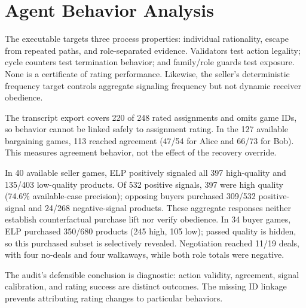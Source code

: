 \section{Agent Behavior Analysis}
\label{sec:behavior}

The executable targets three process properties: individual rationality,
escape from repeated paths, and role-separated evidence. Validators test action
legality; cycle counters test termination behavior; and family/role guards test
exposure. None is a certificate of rating performance. Likewise, the seller's
deterministic frequency target controls aggregate signaling frequency but not
dynamic receiver obedience.

The transcript export covers 220 of 248 rated assignments and omits game IDs,
so behavior cannot be linked safely to assignment rating. In the 127 available
bargaining games, 113 reached agreement (47/54 for Alice and 66/73 for Bob).
This measures agreement behavior, not the effect of the recovery override.

In 40 available seller games, ELP positively signaled all 397 high-quality and
135/403 low-quality products. Of 532 positive signals, 397 were high quality
(74.6\% available-case precision); opposing buyers purchased 309/532 positive-
signal and 24/268 negative-signal products. These aggregate responses neither
establish counterfactual purchase lift nor verify obedience. In 34 buyer games,
ELP purchased 350/680 products (245 high, 105 low); passed quality is hidden, so
this purchased subset is selectively revealed. Negotiation reached 11/19 deals,
with four no-deals and four walkaways, while both role totals were negative.

The audit's defensible conclusion is diagnostic: action validity, agreement,
signal calibration, and rating success are distinct outcomes. The missing ID
linkage prevents attributing rating changes to particular behaviors.
